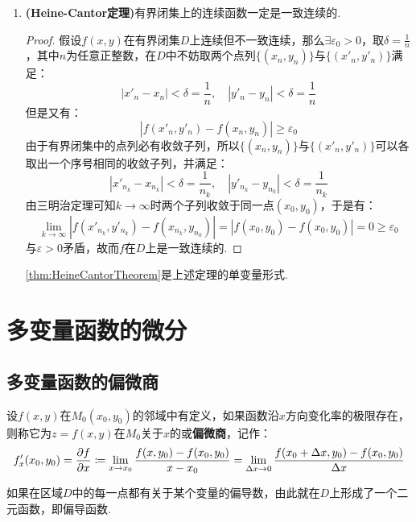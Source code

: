 \begin{enumerate}[property]
\begin{proof}
        有上界则必有上确界，记：
        \[A = \sup_{(x,y)\in D}f(x,y)\]
        则对$\forall n>0$有$A-\frac{1}{n}$不是上确界，则$\exists (x_n,y_n) \in D$使得：
        \[A \geqslant f(x_n,y_n) > A-\frac{1}{n}\]
        则根据三明治定理$n \to \infty$时，$f(x,y)$能够取到最大值.最小值的证明同理.
    \end{proof}
    \cref{thm:TheMostValuableTheorem}是上述定理的单变量形式.
    \item \textbf{(Heine-Cantor定理)}有界闭集上的连续函数一定是一致连续的.
    \begin{proof}
        假设$f(x,y)$在有界闭集$D$上连续但不一致连续，那么$\exists\varepsilon_0 > 0$，取$\delta = \frac{1}{n}$，其中$n$为任意正整数，在$D$中不妨取两个点列$\{(x_n,y_n)\}$与$\{(x'_n,y'_n)\}$满足：
        \[|x'_n - x_n| < \delta = \frac{1}{n},\quad |y'_n-y_n| < \delta = \frac{1}{n}\]
        但是又有：
        \[|f(x'_n,y'_n) - f(x_n,y_n)| \geqslant \varepsilon_0\]
        由于有界闭集中的点列必有收敛子列，所以$\{(x_n,y_n)\}$与$\{(x'_n,y'_n)\}$可以各取出一个序号相同的收敛子列，并满足：
        \[|x'_{n_k} - x_{n_k}| < \delta = \frac{1}{n_k},\quad |y'_{n_k}-y_{n_k}| < \delta = \frac{1}{n_k}\]
        由三明治定理可知$k \to \infty$时两个子列收敛于同一点$(x_0,y_0)$，于是有：
        \[\lim\limits_{k \to \infty}|f(x'_{n_k},y'_{n_k}) - f(x_{n_k},y_{n_k})| = |f(x_0,y_0) - f(x_0,y_0)| = 0 \geqslant \varepsilon_0\]
        与$\varepsilon > 0$矛盾，故而$f$在$D$上是一致连续的.
    \end{proof}
    \cref{thm:HeineCantorTheorem}是上述定理的单变量形式.
\end{enumerate}


\section{多变量函数的微分}
\subsection{多变量函数的偏微商}
\begin{definition}
    设$f(x,y)$在$M_0(x_0,y_0)$的邻域中有定义，如果函数沿$x$方向变化率的极限存在，则称它为$z=f(x,y)$在$M_0$关于$x$的或\textbf{偏微商}，记作：
    \[f'_x(x_0,y_0) = \pdv{f}{x} \coloneq \lim\limits_{x \to x_0}\frac{f(x,y_0) - f(x_0,y_0)}{x-x_0} = \lim\limits_{\Delta x \to 0}\frac{f(x_0+\Delta x,y_0)-f(x_0,y_0)}{\Delta x}\]
\end{definition}
如果在区域$D$中的每一点都有关于某个变量的偏导数，由此就在$D$上形成了一个二元函数，即偏导函数.

